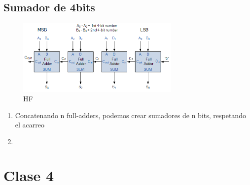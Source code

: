 \documentclass{article}
\begin{document}
        \subsection{Sumador de 4bits}
        \begin{figure}
            \includegraphics[width=300px]{sumador4bits.png}
            \caption{HF}
            \label{fig:Sumador 4bits}
        \end{figure}
        \begin{enumerate}
            \item Concatenando n full-adders, podemos crear sumadores de n bits, respetando el acarreo
            \item 
        \end{enumerate}
        \section{Clase 4}
\end{document}
